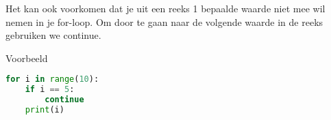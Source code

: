 Het kan ook voorkomen dat je uit een reeks 1 bepaalde waarde niet mee wil nemen in je for-loop. Om door te gaan naar de volgende waarde in de reeks gebruiken we continue.

Voorbeeld
\begin{lstlisting}[language=python]
for i in range(10):
    if i == 5:
        continue
    print(i)
\end{lstlisting}

